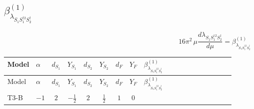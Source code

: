 \documentclass{article}
\begin{document}
\begin{landscape}
\section*{$\beta_{\lambda_{S_1 S_1^{\dagger 2}S_2^\dagger}}^{(1)}$}
\[16\pi^2\,\mu\frac{d \lambda_{S_1 S_1^{\dagger 2}S_2^\dagger}}{d\mu}=\beta_{\lambda_{S_1 S_1^{\dagger 2}S_2^\dagger}}^{(1)}\]
\tiny
\begin{longtable}{@{}llcccccc >{\raggedright\arraybackslash}p{0.54\linewidth}@{}}
\toprule
Model & $\alpha$ & $d_{S_1}$ & $Y_{S_1}$ & $d_{S_2}$ & $Y_{S_2}$ & $d_F$ & $Y_F$ & $\beta_{\lambda_{S_1 S_1^{\dagger 2}S_2^\dagger}}^{(1)}$ \\
\midrule
\endfirsthead
\toprule
Model & $\alpha$ & $d_{S_1}$ & $Y_{S_1}$ & $d_{S_2}$ & $Y_{S_2}$ & $d_F$ & $Y_F$ & $\beta_{\lambda_{S_1 S_1^{\dagger 2}S_2^\dagger}}^{(1)}$ \\
\midrule
\endhead
T3-B & $-1$ & $2$ & $-\frac{1}{2}$ & $2$ & $\frac{1}{2}$ & $1$ & $0$ & \scriptsize\adjustbox{max width=\linewidth}{$\begin{gathered} {\lambda_{12}} (\operatorname{Tr}\!\left({y_2}\,\left({y_1}\right)^{\dagger}\right)+6 {\lambda_{S_1^\dagger S_2 S_2^{\dagger 2}}}+6 {\lambda_{S_1 S_1^{\dagger 2}S_2^\dagger}}) \\ +{\lambda_{12}^{\rm Adj}} \left(\frac{1}{12} \operatorname{Tr}\!\left({y_2}\,\left({y_1}\right)^{\dagger}\right)+\frac{{\lambda_{S_1^\dagger S_2 S_2^{\dagger 2}}}}{6}+\frac{5 {\lambda_{S_1 S_1^{\dagger 2}S_2^\dagger}}}{6}\right) \\ +{\lambda_{S_1}} (\operatorname{Tr}\!\left({y_2}\,\left({y_1}\right)^{\dagger}\right)+12 {\lambda_{S_1 S_1^{\dagger 2}S_2^\dagger}}) \\ +{\lambda_{S_1^{\dagger 2}S_2^{\dagger 2}}} (2 \operatorname{Tr}\!\left({y_1}\,\left({y_2}\right)^{\dagger}\right)+4 (\left({\lambda_{S_1^\dagger S_2 S_2^{\dagger 2}}}\right)^{*}+5 \left({\lambda_{S_1 S_1^{\dagger 2}S_2^\dagger}}\right)^{*})) \\ +{\lambda_{S_1 S_1^{\dagger 2}S_2^\dagger}} (3 \operatorname{Tr}\!\left({y_1}\,\left({y_1}\right)^{\dagger}\right)+\operatorname{Tr}\!\left({y_2}\,\left({y_2}\right)^{\dagger}\right)) \\ -4 \operatorname{Tr}\!\left({y_1}\,\left({y_1}\right)^{\dagger}\,{y_2}\,\left({y_1}\right)^{\dagger}\right) \\ -9 {g_2}^2 {\lambda_{S_1 S_1^{\dagger 2}S_2^\dagger}} \\ -3 {g_Y}^2 {\lambda_{S_1 S_1^{\dagger 2}S_2^\dagger}} \\ +2 {\lambda_{H1}} {\lambda_{H H^\dagger S_1^\dagger S_2^\dagger}^{\rm Cross}} \\ -\frac{{\lambda_{H1}^{\rm Adj}} {\lambda_{H H^\dagger S_1^\dagger S_2^\dagger}^{\rm Cross}}}{6} \\ +4 {\lambda_{H^\dagger H^\dagger S_1^\dagger S_1^\dagger}} {\lambda_{T3}}\end{gathered}$} \\

\end{longtable}
\end{landscape}
\end{document}
